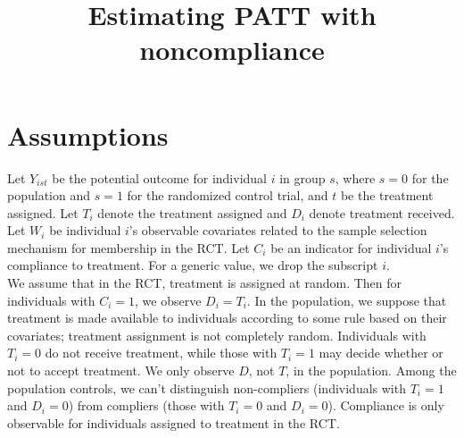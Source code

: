 \documentclass{article}
\title{Estimating PATT with noncompliance}
\theoremstyle{plain}
\begin{document}
\maketitle


\section{Assumptions}
Let $Y_{ist}$ be the potential outcome for individual $i$ in group $s$, where $s=0$ for the population and $s=1$ for the randomized control trial, and $t$ be the treatment assigned.  Let $T_i$ denote the treatment assigned and $D_i$ denote treatment received. Let $W_i$ be individual $i$'s observable covariates related to the sample selection mechanism for membership in the RCT.  Let $C_i$ be an indicator for individual $i$'s compliance to treatment.  For a generic value, we drop the subscript $i$.  \\

We assume that in the RCT, treatment is assigned at random.  Then for individuals with $C_i = 1$, we observe $D_i = T_i$.  In the population, we suppose that treatment is made available to individuals according to some rule based on their covariates; treatment assignment is not completely random. Individuals with $T_i = 0$ do not receive treatment, while those with $T_i=1$ may decide whether or not to accept treatment.  We only observe $D$, not $T$, in the population.  Among the population controls, we can't distinguish non-compliers (individuals with $T_i=1$ and $D_i = 0$) from compliers (those with $T_i = 0$ and $D_i = 0$).  Compliance is only observable for individuals assigned to treatment in the RCT. \\
\end{document}
